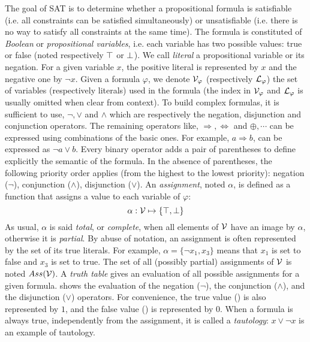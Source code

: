 The goal of SAT is to determine whether a propositional formula is satisfiable (i.e. all constraints can be satisfied simultaneously)
or unsatisfiable (i.e. there is no way to satisfy all constraints at the same time).
The formula is constituted of \emph{Boolean} or \emph{propositional variables},
i.e. each variable has two possible values: true or false (noted respectively $\top$ or $\bot$).
We call \emph{literal} a propositional variable or its negation.
For a given variable $x$, the positive literal is represented by $x$ and the negative one by $\neg x$.
Given a formula $\varphi$, we denote $\mathcal{V}_\varphi$ (respectively $\mathcal{L}_\varphi$) the set of variables (respectively literals) used in the formula (the index in $\mathcal{V}_\varphi$ and $\mathcal{L}_\varphi$ is usually omitted when
clear from context).
To build complex formulas, it is sufficient to use, $\neg, \lor$ and $\land$ which are respectively 
the negation, disjunction and conjunction operators. The remaining operators like, $\Rightarrow, \Leftrightarrow$ and
$\oplus, \cdots$ can be expressed using combinations of the basic ones.
For example, $a \Rightarrow b$, can be expressed as $ \neg a \lor b$.
Every binary operator adds a pair of parentheses to define explicitly the semantic of the formula.
In the absence of parentheses, the following priority order applies (from the highest to the lowest priority):
negation ($\neg$), conjunction ($\land$), disjunction ($\lor$).
An \emph{assignment}, noted $\alpha$, is defined as a function that assigns a value to each variable of $\varphi$:
 $$\alpha: \mathcal{V} \mapsto \{ \top, \bot \}$$
 As usual, $\alpha$ is said \emph{total}, or \emph{complete}, when all elements of $\mathcal{V}$ have an image by
$\alpha$, otherwise it is \emph{partial}. By abuse of notation, an assignment is
often represented by the set of its true literals. For example, $\alpha = \{\neg x_1, x_3 \}$ means that $x_1$
is set to false and $x_3$ is set to true.
  The set of all (possibly partial) assignments of $\mathcal{V}$ is noted $Ass(\mathcal{V})$.
A \emph{truth table} gives an evaluation of all possible assignments for a given formula.
 shows the evaluation of the negation ($\neg$), the conjunction ($\land$), and the disjunction ($\lor$) operators.
For convenience, the true value (\true) is also represented by $1$, and the false value (\false) is represented by $0$.
When a formula is always true, independently from the assignment, it is called a \emph{tautology}: $x \lor \neg x$ is 
an example of tautology.

